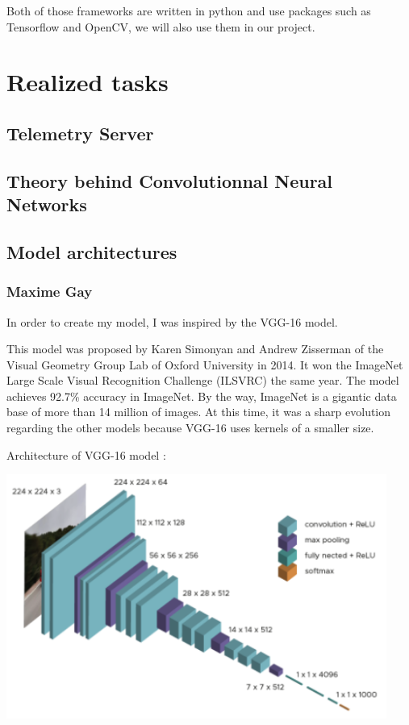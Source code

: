 \documentclass[12pt]{article}
\begin{document}
Both of those frameworks are written in python and use packages such as Tensorflow and OpenCV, we will also use them in our project.
\newpage



\section{Realized tasks}

\subsection{Telemetry Server}

\subsection{Theory behind Convolutionnal Neural Networks}

\subsection{Model architectures}

\subsubsection{Maxime Gay}
In order to create my model, I was inspired by the VGG-16 model.

This model was proposed by Karen Simonyan and Andrew Zisserman of the Visual Geometry Group Lab of Oxford University in 2014. It won the ImageNet Large Scale Visual Recognition Challenge (ILSVRC) the same year. The model achieves 92.7\% accuracy in ImageNet. By the way, ImageNet is a gigantic data base of more than 14 million of images. At this time, it was a sharp evolution regarding the other models because VGG-16 uses kernels of a smaller size.


Architecture of VGG-16 model :

\centerline{\includegraphics[height=8cm]{../../docs/VGG16.png}}
\end{document}

